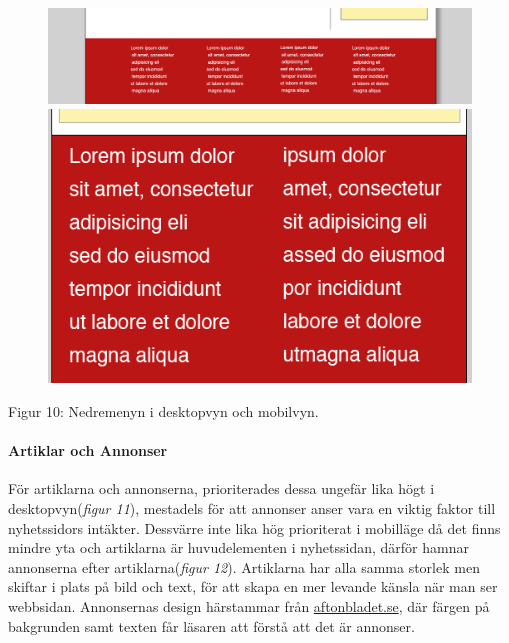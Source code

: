 \documentclass[11pt]{article}
\begin{document}
\begin{figure}[H]
\centerline{%
\includegraphics[scale=0.237]{pics/menydesktopbot.png}\hspace{2em}%
\includegraphics[scale=0.35]{pics/menymobilbot.png}%
}
\end{figure}
\hspace{0.5cm}Figur 10: Nedremenyn i desktopvyn och mobilvyn.
\newpage
\paragraph{Artiklar och Annonser}\mbox{}

För artiklarna och annonserna, prioriterades dessa ungefär lika högt i desktopvyn(\textit{figur 11}), mestadels för att annonser anser vara en viktig faktor till nyhetssidors intäkter. Dessvärre inte lika hög prioriterat i mobilläge då det finns mindre yta och artiklarna är huvudelementen i nyhetssidan, därför hamnar annonserna efter artiklarna(\textit{figur 12}). Artiklarna har alla samma storlek men skiftar i plats på bild och text, för att skapa en mer levande känsla när man ser webbsidan. Annonsernas design härstammar från \href{www.aftonbladet.se}{aftonbladet.se}, där färgen på bakgrunden samt texten får läsaren att förstå att det är annonser. 
\\
\end{document}
